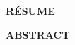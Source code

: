 
\thispagestyle{empty}

\vfill

\begin{center}
	\LARGE{\textbf{RÉSUME}}\\[1.0cm]
\end{center}


\large{ 

}



\vfill


\begin{center}
	\LARGE{\textbf{ABSTRACT}}\\[1.0cm]
\end{center}


\large{ 


}

\vfill

